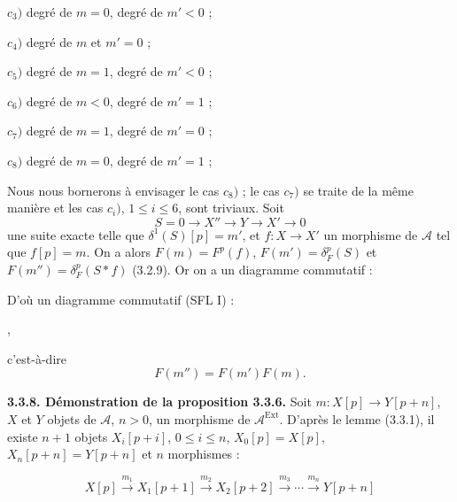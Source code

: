 \clearpage
{}%
\begingroup\small\setlength{\parskip}{0pt}\setlength{\emergencystretch}{1.5em}
\setlength{\abovedisplayskip}{4pt plus 2pt minus 2pt}%
\setlength{\belowdisplayskip}{4pt plus 2pt minus 2pt}%

\noindent$c_3)$ degré de $m=0$, degré de $m'<0$ ;

\noindent$c_4)$ degré de $m$ et $m'=0$ ;

\noindent$c_5)$ degré de $m=1$, degré de $m'<0$ ;

\noindent$c_6)$ degré de $m<0$, degré de $m'=1$ ;

\noindent$c_7)$ degré de $m=1$, degré de $m'=0$ ;

\noindent$c_8)$ degré de $m=0$, degré de $m'=1$ ;

Nous nous bornerons à envisager le cas $c_8)$ ; le cas $c_7)$ se traite de
la même manière et les cas $c_i)$, $1\leq i\leq 6$, sont triviaux. Soit
\[
S=0\longrightarrow X''\longrightarrow Y\longrightarrow X'\longrightarrow0
\]
une suite exacte telle que $\delta^1(S)[p]=m'$, et
$f\colon X\longrightarrow X'$ un morphisme de $\mathcal A$ tel que
$f[p]=m$. On a alors $F(m)=F^p(f)$, $F(m')=\delta_F^p(S)$ et
$F(m'')=\delta_F^p(S*f)$ (3.2.9). Or on a un diagramme commutatif :

\begin{center}
\end{center}
D'où un diagramme commutatif (SFL I) :

\begin{center}
\hspace{1em},
\end{center}
c'est-à-dire
\[
F(m'')=F(m')F(m).
\]

\medskip\noindent\textbf{3.3.8. Démonstration de la proposition 3.3.6.}\quad
Soit $m\colon X[p]\longrightarrow Y[p+n]$, $X$ et $Y$ objets de
$\mathcal A$, $n>0$, un morphisme de $\mathcal A^{\operatorname{Ext}}$.
D'après le lemme (3.3.1), il existe $n+1$ objets $X_i[p+i]$,
$0\leq i\leq n$, $X_0[p]=X[p]$, $X_n[p+n]=Y[p+n]$ et $n$ morphismes :

\[
X[p]\xrightarrow{m_1}X_1[p+1]\xrightarrow{m_2}X_2[p+2]
\xrightarrow{m_3}\cdots\xrightarrow{m_n}Y[p+n]
\]
\endgroup
